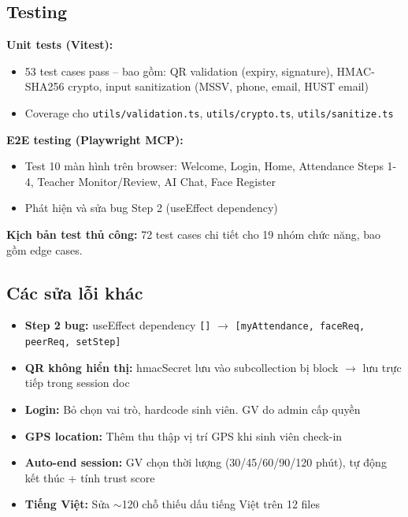 \documentclass{article}
\begin{document}
\subsection{Testing}

\textbf{Unit tests (Vitest):}
\begin{itemize}[leftmargin=1.5em]
  \item 53 test cases pass -- bao gồm: QR validation (expiry, signature), HMAC-SHA256 crypto, input sanitization (MSSV, phone, email, HUST email)
  \item Coverage cho \texttt{utils/validation.ts}, \texttt{utils/crypto.ts}, \texttt{utils/sanitize.ts}
\end{itemize}

\textbf{E2E testing (Playwright MCP):}
\begin{itemize}[leftmargin=1.5em]
  \item Test 10 màn hình trên browser: Welcome, Login, Home, Attendance Steps 1-4, Teacher Monitor/Review, AI Chat, Face Register
  \item Phát hiện và sửa bug Step 2 (useEffect dependency)
\end{itemize}

\textbf{Kịch bản test thủ công:} 72 test cases chi tiết cho 19 nhóm chức năng, bao gồm edge cases.

\subsection{Các sửa lỗi khác}

\begin{itemize}[leftmargin=1.5em]
  \item \textbf{Step 2 bug:} useEffect dependency \texttt{[]} $\rightarrow$ \texttt{[myAttendance, faceReq, peerReq, setStep]}
  \item \textbf{QR không hiển thị:} hmacSecret lưu vào subcollection bị block $\rightarrow$ lưu trực tiếp trong session doc
  \item \textbf{Login:} Bỏ chọn vai trò, hardcode sinh viên. GV do admin cấp quyền
  \item \textbf{GPS location:} Thêm thu thập vị trí GPS khi sinh viên check-in
  \item \textbf{Auto-end session:} GV chọn thời lượng (30/45/60/90/120 phút), tự động kết thúc + tính trust score
  \item \textbf{Tiếng Việt:} Sửa $\sim$120 chỗ thiếu dấu tiếng Việt trên 12 files
\end{itemize}
\end{document}
